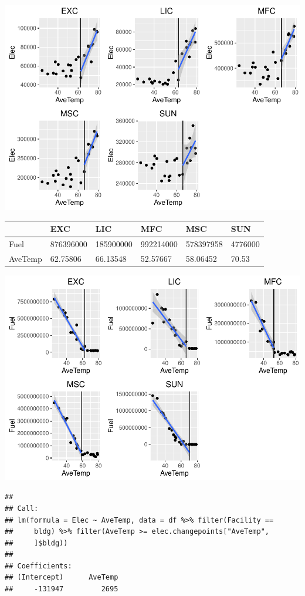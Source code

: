 \documentclass[]{article}
\begin{document}
\includegraphics{Paper-BuildingEnergySim_files/figure-latex/unnamed-chunk-2-1.pdf}

\begin{longtable}[c]{@{}llllll@{}}
\toprule
& EXC & LIC & MFC & MSC & SUN\tabularnewline
\midrule
\endhead
Fuel & 876396000 & 185900000 & 992214000 & 578397958 &
4776000\tabularnewline
AveTemp & 62.75806 & 66.13548 & 52.57667 & 58.06452 &
70.53\tabularnewline
\bottomrule
\end{longtable}

\includegraphics{Paper-BuildingEnergySim_files/figure-latex/unnamed-chunk-3-1.pdf}

\begin{verbatim}
## 
## Call:
## lm(formula = Elec ~ AveTemp, data = df %>% filter(Facility == 
##     bldg) %>% filter(AveTemp >= elec.changepoints["AveTemp", 
##     ]$bldg))
## 
## Coefficients:
## (Intercept)      AveTemp  
##     -131947         2695
\end{verbatim}
\end{document}
